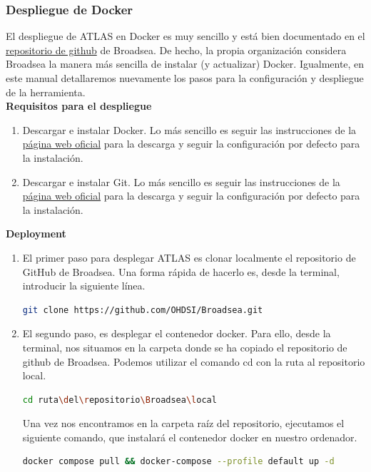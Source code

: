 \documentclass{article}
\begin{document}
\subsubsection{Despliegue de Docker}

El despliegue de ATLAS en Docker es muy sencillo y está bien documentado en el  \href{https://github.com/OHDSI/Broadsea}{repositorio de github} de Broadsea. De hecho, la propia organización considera Broadsea la manera más sencilla de instalar (y actualizar) Docker. Igualmente, en este manual detallaremos nuevamente los pasos para la configuración y despliegue de la herramienta.\\

\textbf{Requisitos para el despliegue}
\begin{enumerate}
    \item Descargar e instalar Docker. Lo más sencillo es seguir las instrucciones de la \href{https://docs.docker.com/engine/install/}{página web oficial} para la descarga y seguir la configuración por defecto para la instalación.
    
    \item Descargar e instalar Git. Lo más sencillo es seguir las instrucciones de la \href{https://git-scm.com/downloads}{página web oficial} para la descarga y seguir la configuración por defecto para la instalación.
\end{enumerate}

\textbf{Deployment}
\begin{enumerate}
    \item El primer paso para desplegar ATLAS es clonar localmente el repositorio de GitHub de Broadsea. Una forma rápida de hacerlo es, desde la terminal, introducir la siguiente línea.

\begin{lstlisting}[language=sh]
        git clone https://github.com/OHDSI/Broadsea.git
\end{lstlisting}

    \item El segundo paso, es desplegar el contenedor docker. Para ello, desde la terminal, nos situamos en la carpeta donde se ha copiado el repositorio de github de Broadsea. Podemos utilizar el comando cd con la ruta al repositorio local.

\begin{lstlisting}[language=sh]
        cd ruta\del\repositorio\Broadsea\local
\end{lstlisting}

    Una vez nos encontramos en la carpeta raíz del repositorio, ejecutamos el siguiente comando, que instalará el contenedor docker en nuestro ordenador.

\begin{lstlisting}[language=sh]
    docker compose pull && docker-compose --profile default up -d
\end{lstlisting}

\end{enumerate}
\end{document}
